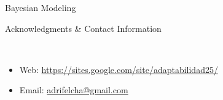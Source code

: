 \documentclass[final]{beamer}
\newlength{\onecolwid}
\newlength{\twocolwid}
\begin{document}
\begin{frame}[t]
\begin{columns}[t]
\begin{column}{\twocolwid}
\begin{columns}[t,totalwidth=\twocolwid]
\begin{column}{\onecolwid}
\begin{alertblock}{Bayesian Modeling}
\end{alertblock}



\begin{block}{Acknowledgments \& Contact Information}

\small{} \\

\begin{itemize}
\item Web: \href{https://sites.google.com/site/adaptabilidad25/}{https://sites.google.com/site/adaptabilidad25/}
\item Email: \href{mailto:adrifelcha@gmail.com}{adrifelcha@gmail.com}
\end{itemize}


\end{block}





\end{column} %

\end{columns} %


\begin{columns}[t,totalwidth=\twocolwid] %

\begin{column}{\onecolwid} %


\end{column} %

\end{columns} %


\end{column}
\end{columns}
\end{frame}
\end{document}
